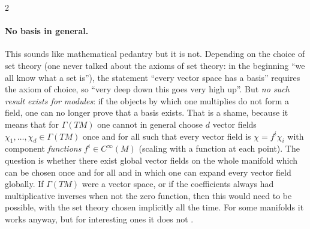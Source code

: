 \begin{paracol}{2}
\paragraph{No basis in general.} This sounds like mathematical pedantry but it is not. Depending on the choice of set theory (one never talked about the axioms of set theory: in the beginning ``we all know what a set is''), the statement ``every vector space has a basis'' requires the axiom of choice, so ``very deep down this goes very high up''. But \emph{no such result exists for modules}: if the objects by which one multiplies do not form a field, one can no longer prove that a basis exists.
That is a shame, because it means that for $\Gamma(TM)$ one cannot in general choose $d$ vector fields $\chi_1,\dots,\chi_d\in\Gamma(TM)$ once and for all such that every vector field is $\chi=f^i\chi_i$ with component \emph{functions} $f^i\in C^\infty(M)$ (scaling with a function at each point). The question is whether there exist global vector fields on the whole manifold which can be chosen once and for all and in which one can expand every vector field globally. If $\Gamma(TM)$ were a vector space, or if the coefficients always had multiplicative inverses when not the zero function, then this would need to be possible, with the set theory chosen implicitly all the time.
For some manifolds it works anyway, but for interesting ones it does not .


\end{paracol}
